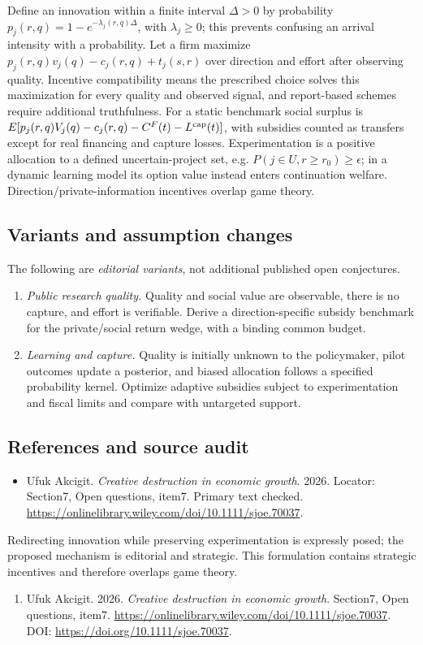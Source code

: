 \documentclass[11pt,a4paper]{article}
\begin{document}
Define an innovation within a finite interval \(\Delta>0\) by probability \(p_j(r,q)=1-e^{-\lambda_j(r,q)\Delta}\), with \(\lambda_j\ge0\); this prevents confusing an arrival intensity with a probability. Let a firm maximize \(p_j(r,q)v_j(q)-c_j(r,q)+t_j(s,r)\) over direction and effort after observing quality. Incentive compatibility means the prescribed choice solves this maximization for every quality and observed signal, and report-based schemes require additional truthfulness. For a static benchmark social surplus is \(E[p_j(r,q)V_j(q)-c_j(r,q)-C^F(t)-L^{\rm cap}(t)]\), with subsidies counted as transfers except for real financing and capture losses. Experimentation is a positive allocation to a defined uncertain-project set, e.g. \(P(j\in U,r\ge r_0)\ge\epsilon\); in a dynamic learning model its option value instead enters continuation welfare. Direction/private-information incentives overlap game theory.
\subsection*{Variants and assumption changes}
The following are \emph{editorial variants}, not additional published open conjectures.
\begin{enumerate}
\item \emph{Public research quality.} Quality and social value are observable, there is no capture, and effort is verifiable. Derive a direction-specific subsidy benchmark for the private/social return wedge, with a binding common budget.
\item \emph{Learning and capture.} Quality is initially unknown to the policymaker, pilot outcomes update a posterior, and biased allocation follows a specified probability kernel. Optimize adaptive subsidies subject to experimentation and fiscal limits and compare with untargeted support.
\end{enumerate}
\subsection*{References and source audit}
\begin{itemize}
\item Ufuk Akcigit. \emph{Creative destruction in economic growth}. 2026. Locator: Section7, Open questions, item7. Primary text checked. \url{https://onlinelibrary.wiley.com/doi/10.1111/sjoe.70037}.
\end{itemize}
Redirecting innovation while preserving experimentation is expressly posed; the proposed mechanism is editorial and strategic. This formulation contains strategic incentives and therefore overlaps game theory.
\begin{enumerate}\raggedright
\item\hypertarget{definitions:source:30007551:1}{} Ufuk Akcigit. 2026. \emph{Creative destruction in economic growth}. Section7, Open questions, item7.
\url{https://onlinelibrary.wiley.com/doi/10.1111/sjoe.70037}.
DOI: \url{https://doi.org/10.1111/sjoe.70037}.
\end{enumerate}
\end{document}
